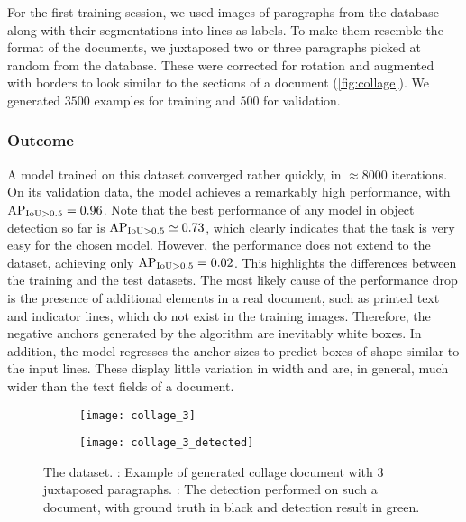 			For the first training session, we used images of paragraphs from the database along with their segmentations into lines as labels. To make them resemble the format of the documents, we juxtaposed two or three paragraphs picked at random from the database. These were corrected for rotation and augmented with borders to look similar to the sections of a document (\autoref{fig:collage}). We generated \(3500\) examples for training and \(500\) for validation.


		\subsubsection*{Outcome}

			A \FRCNN{} model trained on this dataset converged rather quickly, in \(\approx 8000\) iterations. On its validation data, the model achieves a remarkably high performance, with \mbox{\(\operatorname{\operatorname{AP}_{\operatorname{IoU} > 0.5}} = 0.96\)}. Note that the best performance of any model in object detection so far is \(\operatorname{\operatorname{AP}_{\operatorname{IoU} > 0.5}} \simeq 0.73\), which clearly indicates that the task is very easy for the chosen model. However, the performance does not extend to the  dataset, achieving only \(\operatorname{\operatorname{AP}_{\operatorname{IoU} > 0.5}} = 0.02\). This highlights the differences between the training and the test datasets. The most likely cause of the performance drop is the presence of additional elements in a real document, such as printed text and indicator lines, which do not exist in the training images. Therefore, the negative anchors generated by the algorithm are inevitably white boxes. In addition, the model regresses the anchor sizes to predict boxes of shape similar to the input lines. These display little variation in width and are, in general, much wider than the text fields of a document.

		\begin{figure}
			\begin{subfigure}[c]{\textwidth}
				\texttt{[image: collage\_3]}
				\caption{}
				\label{sfig:collage_clean}
			\end{subfigure}
			\vspace{1em}

			\begin{subfigure}[c]{\textwidth}
				\texttt{[image: collage\_3\_detected]}
				\caption{}
				\label{sfig:collage_detect}
			\end{subfigure}
			\caption[ dataset]{
				The  dataset.
				: Example of generated collage document with 3 juxtaposed paragraphs.
				: The detection performed on such a document, with ground truth in black and detection result in green.
			}
			\label{fig:collage}
		\end{figure}

